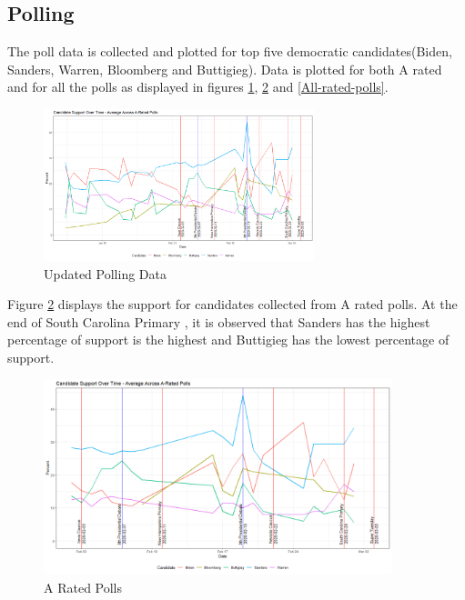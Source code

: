 \subsection{Polling}
The poll data is collected and plotted for top five democratic candidates(Biden, Sanders, Warren, Bloomberg and Buttigieg). Data is plotted for both A rated and for all the polls as displayed in figures \ref{Updated-Polling-Data-1}, \ref{A-rated-polls} and \ref{All-rated-polls}. 
\begin{figure}[H]
    \centering
    \includegraphics[width=0.7\textwidth]{figures/long-A-rated-polls.png}
    \caption{Updated Polling Data}
    \label{Updated-Polling-Data-1}
\end{figure}
Figure \ref{A-rated-polls} displays the support for candidates collected from A rated polls. At the end of  South Carolina Primary , it is observed that Sanders has the highest percentage of support is the highest and Buttigieg has the lowest percentage of support.  
\begin{figure}[H]
    \centering
    \includegraphics[width=0.9\textwidth]{figures/A-rated-polls.png}
    \caption{A Rated Polls}
    \label{A-rated-polls}
\end{figure}

